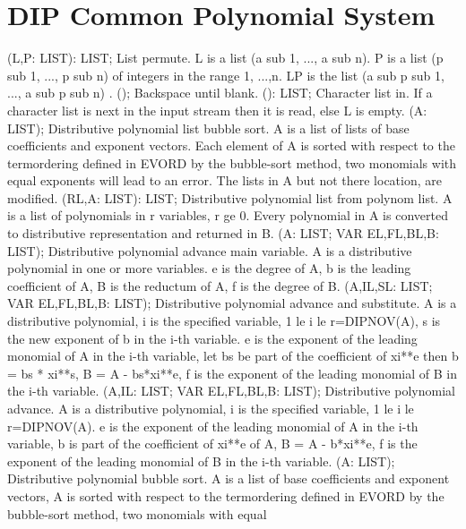 \section{ DIP Common Polynomial System  } 
 (L,P: LIST): LIST; \eproc
\bcom List permute. L is a list (a sub 1, ..., a sub n). P is a list
(p sub 1, ..., p sub n) of integers in the range 1, ...,n. 
LP is the list (a sub p sub 1, ..., a sub p sub n) .  \ecom 
{} (); \eproc
\bcom Backspace until blank.  \ecom 
{} (): LIST; \eproc
\bcom Character list in. If a character list is next in the input
stream then it is read, else L is empty.  \ecom 
{} (A: LIST); \eproc
\bcom Distributive polynomial list bubble sort. A is a list of
lists of base coefficients and exponent vectors.
Each element of A is sorted with respect to the termordering
defined in EVORD by the bubble-sort method,
two monomials with equal exponents will lead to an error.
The lists in A but not there location, are modified. \ecom 
{} (RL,A: LIST): LIST; \eproc
\bcom Distributive polynomial list from polynom list. A is a list
of polynomials in r variables, r ge 0. Every polynomial in A
is converted to distributive representation and returned in B.  \ecom 
{} (A: LIST; VAR EL,FL,BL,B: LIST); \eproc
\bcom Distributive polynomial advance main variable. A is a
distributive polynomial in one or more variables. e is the
degree of A, b is the leading coefficient of A,
B is the reductum of A, f is the degree of B. \ecom 
{} (A,IL,SL: LIST; VAR EL,FL,BL,B: LIST); \eproc
\bcom Distributive polynomial advance and substitute. A is a
distributive polynomial, i is the specified variable,
1 le i le r=DIPNOV(A), s is the new exponent of b
in the i-th variable. e is the exponent of the leading
monomial of A in the i-th variable, let bs be part of the
coefficient of xi**e then b = bs * xi**s,
B = A - bs*xi**e, f is the exponent of the leading monomial
of B in the i-th variable. \ecom 
{} (A,IL: LIST; VAR EL,FL,BL,B: LIST); \eproc
\bcom Distributive polynomial advance. A is a distributive polynomial,
i is the specified variable, 1 le i le r=DIPNOV(A). e is
the exponent of the leading monomial of A in the i-th variable,
b is part of the coefficient of xi**e of A,
B = A - b*xi**e, f is the exponent of the leading monomial
of B in the i-th variable. \ecom 
{} (A: LIST); \eproc
\bcom Distributive polynomial bubble sort. A is a list of
base coefficients and exponent vectors, A is sorted
with respect to the termordering defined in EVORD
by the bubble-sort method, two monomials with equal

